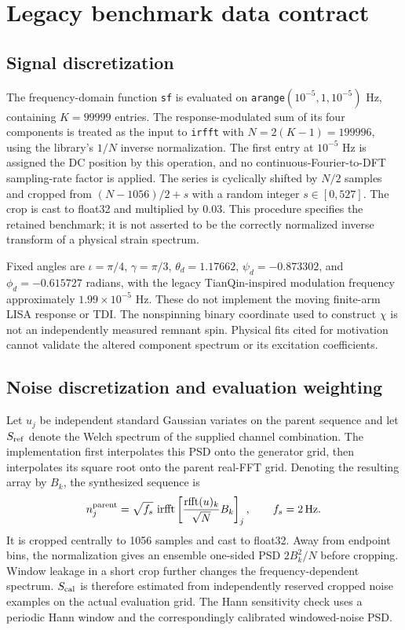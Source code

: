 \documentclass[10pt,prd,aps,a4paper,twocolumn,superscriptaddress,nofootinbib,floatfix]{revtex4-2}
\begin{document}
\section{Legacy benchmark data contract}\label{app:sequence_modeling}
\subsection{Signal discretization}
The frequency-domain function \texttt{sf} is evaluated on \texttt{arange}$(10^{-5},1,10^{-5})$ Hz, containing $K=99999$ entries. The response-modulated sum of its four components is treated as the input to \texttt{irfft} with $N=2(K-1)=199996$, using the library's $1/N$ inverse normalization. The first entry at $10^{-5}$ Hz is assigned the DC position by this operation, and no continuous-Fourier-to-DFT sampling-rate factor is applied. The series is cyclically shifted by $N/2$ samples and cropped from $(N-1056)/2+s$ with a random integer $s\in[0,527]$. The crop is cast to float32 and multiplied by 0.03. This procedure specifies the retained benchmark; it is not asserted to be the correctly normalized inverse transform of a physical strain spectrum.

Fixed angles are $\iota=\pi/4$, $\gamma=\pi/3$, $\theta_d=1.17662$, $\psi_d=-0.873302$, and $\phi_d=-0.615727$ radians, with the legacy TianQin-inspired modulation frequency approximately $1.99\times10^{-5}$ Hz. These do not implement the moving finite-arm LISA response or TDI. The nonspinning binary coordinate used to construct $\chi$ is not an independently measured remnant spin. Physical fits cited for motivation~\cite{berti2006gravitational,zhang2021parameter,Baibhav2018energy} cannot validate the altered component spectrum or its excitation coefficients.

\subsection{Noise discretization and evaluation weighting}
Let $u_j$ be independent standard Gaussian variates on the parent sequence and let $S_{\rm ref}$ denote the Welch spectrum of the supplied channel combination. The implementation first interpolates this PSD onto the generator grid, then interpolates its square root onto the parent real-FFT grid. Denoting the resulting array by $B_k$, the synthesized sequence is
\begin{equation}n_j^{\rm parent}=\sqrt{f_s}\,\operatorname{irfft}\left[\frac{\operatorname{rfft}(u)_k}{\sqrt N}B_k\right]_j,\qquad f_s=2\,\mathrm{Hz}.
\end{equation}
It is cropped centrally to 1056 samples and cast to float32. Away from endpoint bins, the normalization gives an ensemble one-sided PSD $2B_k^2/N$ before cropping. Window leakage in a short crop further changes the frequency-dependent spectrum. $S_{\rm cal}$ is therefore estimated from independently reserved cropped noise examples on the actual evaluation grid. The Hann sensitivity check uses a periodic Hann window and the correspondingly calibrated windowed-noise PSD.
\end{document}
